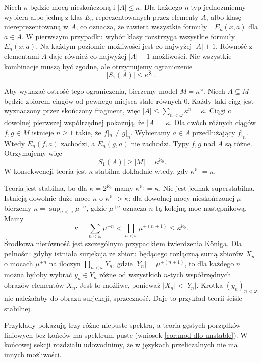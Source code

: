 \begin{przyklad}
Niech $\kappa$ będzie mocą nieskończoną
i $|A|\leq\kappa$. Dla każdego $n$ typ
jednozmienny wybiera albo jedną z klas
$E_n$ reprezentowanych przez elementy $A$,
albo klasę niereprezentowaną w $A$,
co oznacza, że zawiera wszystkie formuły
$\neg E_n(x,a)$ dla $a\in A$.
W pierwszym przypadku wybór klasy
rozstrzyga wszystkie formuły $E_n(x,a)$.
Na każdym poziomie możliwości jest
co najwyżej $|A|+1$. Równość z elementami
$A$ daje również co najwyżej $|A|+1$
możliwości. Nie wszystkie kombinacje
muszą być zgodne, ale otrzymujemy ograniczenie
\[
|S_1(A)|\leq \kappa^{\aleph_0}.
\]

Aby wykazać ostrość tego ograniczenia,
bierzemy model $M=\kappa^\omega$.
Niech $A\subseteq M$ będzie zbiorem ciągów
od pewnego miejsca stale równych $0$.
Każdy taki ciąg jest wyznaczony przez
skończony fragment, więc
$|A|\leq\sum_{n<\omega}\kappa^n=\kappa$.
Ciągi o dowolnej pierwszej współrzędnej
pokazują, że $|A|=\kappa$.
Dla dwóch różnych ciągów $f,g\in M$
istnieje $n\geq1$ takie, że $f|_n\ne g|_n$.
Wybieramy $a\in A$ przedłużający $f|_n$.
Wtedy $E_n(f,a)$ zachodzi, a $E_n(g,a)$
nie zachodzi. Typy $f,g$ nad $A$ są różne.
Otrzymujemy więc
\[
|S_1(A)|\geq |M|=\kappa^{\aleph_0}.
\]
W konsekwencji teoria jest $\kappa$-stabilna
dokładnie wtedy, gdy $\kappa^{\aleph_0}=\kappa$.

Teoria jest stabilna, bo dla
$\kappa=2^{\aleph_0}$ mamy
$\kappa^{\aleph_0}=\kappa$.
Nie jest jednak superstabilna.
Istnieją dowolnie duże moce $\kappa$
o $\kappa^{\aleph_0}>\kappa$:
dla dowolnej mocy nieskończonej $\mu$
bierzemy $\kappa=\sup_{n<\omega}\mu^{+n}$,
gdzie $\mu^{+n}$ oznacza $n$-tą kolejną moc
następnikową. Mamy
\[
\kappa=\sum_{n<\omega}\mu^{+n}
<\prod_{n<\omega}\mu^{+(n+1)}
\leq\kappa^{\aleph_0}.
\]
Środkowa nierówność jest szczególnym przypadkiem
twierdzenia Königa. Dla pełności: gdyby istniała
surjekcja ze zbioru będącego rozłączną sumą
zbiorów $X_n$ o mocach $\mu^{+n}$ na iloczyn
$\prod_{n<\omega}Y_n$, gdzie $|Y_n|=\mu^{+(n+1)}$,
to dla każdego $n$ można byłoby wybrać $y_n\in Y_n$
różne od wszystkich $n$-tych współrzędnych obrazów
elementów $X_n$. Jest to możliwe, ponieważ
$|X_n|<|Y_n|$. Krotka $(y_n)_{n<\omega}$
nie należałaby do obrazu surjekcji, sprzeczność.
Daje to przykład teorii ściśle stabilnej.
\end{przyklad}

Przykłady pokazują trzy różne niepuste spektra,
a teoria gęstych porządków liniowych bez końców
ma spektrum puste (wniosek \ref{cor:mod-dlo-unstable}).
W końcowej sekcji rozdziału udowodnimy, że w
językach przeliczalnych nie ma innych możliwości.

